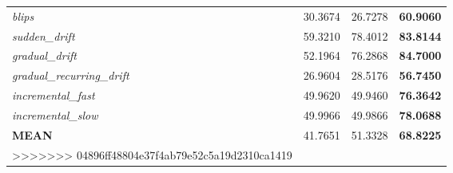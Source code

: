 \documentclass[preprint,12pt]{elsarticle}
\begin{document}
\begin{itemize}
\begin{table*}[!t]
{\begin{tabular}{|l|rrr|}
\textit{blips} & 30.3674 & 26.7278 & \textbf{60.9060}\\ 
\textit{sudden\_drift} & 59.3210 & 78.4012 & \textbf{83.8144}\\ 
\textit{gradual\_drift} & 52.1964 & 76.2868 & \textbf{84.7000}\\ 
\textit{gradual\_recurring\_drift} & 26.9604 & 28.5176 & \textbf{56.7450}\\ 
\textit{incremental\_fast} & 49.9620 & 49.9460 & \textbf{76.3642}\\ 
\textit{incremental\_slow} & 49.9966 & 49.9866 & \textbf{78.0688}\\ 
\midrule
\textbf{MEAN} & 41.7651 & 51.3328 & \textbf{68.8225} \\ 
>>>>>>> 04896ff48804e37f4ab79e52c5a19d2310ca1419
\bottomrule
\end{tabular}
	}
\end{table*}


\begin{table}[!htp]
\renewcommand{\arraystretch}{1.3}
\centering
\scriptsize
\caption{Wilcoxon test results and average rankings of methods (Friedman Procedure \& Adjusted p-value with Holm's Test) for accuracy}
\label{tab:wilcoxon-disc}
\end{table}


\end{itemize}
\end{document}
